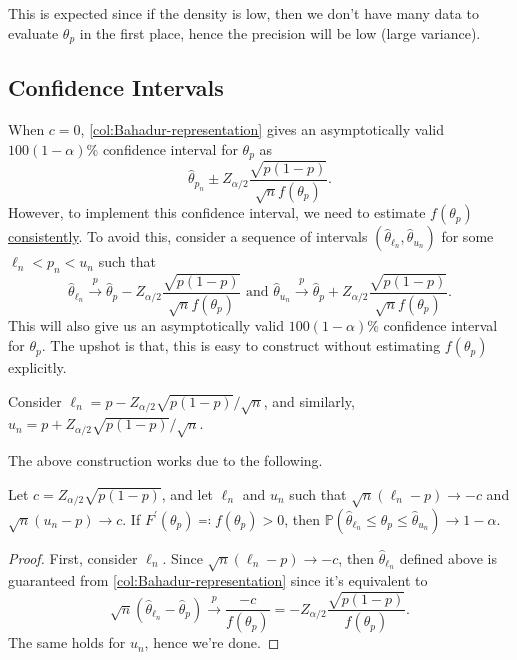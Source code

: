 \begin{intuition}
	This is expected since if the density is low, then we don't have many data to evaluate \(\theta _p\) in the first place, hence the precision will be low (large variance).
\end{intuition}

\subsection{Confidence Intervals}
When \(c = 0\), \autoref{col:Bahadur-representation} gives an asymptotically valid \(100(1 - \alpha )\%\) confidence interval for \(\theta _p\) as
\[
	\hat{\theta} _{p_n} \pm Z_{\alpha / 2} \frac{\sqrt{p(1 - p)} }{\sqrt{n} f(\theta _p)}.
\]
However, to implement this confidence interval, we need to estimate \(f(\theta _p)\) \hyperref[def:consistent]{consistently}. To avoid this, consider a sequence of intervals \((\hat{\theta} _{\ell _n}, \hat{\theta} _{u_n})\) for some \(\ell _n < p_n < u_n\) such that
\[
	\hat{\theta} _{\ell _n}
	\overset{p}{\to} \hat{\theta} _p - Z_{\alpha / 2} \frac{\sqrt{p (1 - p)} }{\sqrt{n} f(\theta _p)}
	\text{ and }
	\hat{\theta} _{u_n}
	\overset{p}{\to} \hat{\theta} _p + Z_{\alpha / 2} \frac{\sqrt{p (1 - p)} }{\sqrt{n} f(\theta _p)}.
\]
This will also give us an asymptotically valid \(100(1 - \alpha )\%\) confidence interval for \(\theta _p\). The upshot is that, this is easy to construct without estimating \(f(\theta _p)\) explicitly.

\begin{eg}
	Consider \(\ell _n = p - Z_{\alpha / 2} \sqrt{p (1 - p)} / \sqrt{n} \), and similarly, \(u_n = p + Z_{\alpha / 2} \sqrt{p (1 - p)} / \sqrt{n} \).
\end{eg}

The above construction works due to the following.

\begin{proposition}\label{prop:sample-quantile-confidence-interval}
	Let \(c = Z_{\alpha / 2} \sqrt{p(1 - p)} \), and let \(\ell _n\) and \(u_n\) such that \(\sqrt{n} (\ell _n - p) \to -c\) and \(\sqrt{n} (u_n - p) \to c\). If \(F^{\prime} (\theta _p) \eqqcolon f(\theta _p) > 0\), then \(\mathbb{P} (\hat{\theta} _{\ell _n} \leq \theta _p \leq \hat{\theta} _{u_n}) \to 1 - \alpha \).
\end{proposition}
\begin{proof}
	First, consider \(\ell _n\). Since \(\sqrt{n} (\ell _n - p) \to -c\), then \(\hat{\theta} _{\ell _n}\) defined above is guaranteed from \autoref{col:Bahadur-representation} since it's equivalent to
	\[
		\sqrt{n} (\hat{\theta} _{\ell _n} - \hat{\theta} _p)
		\overset{p}{\to} \frac{-c}{f(\theta _p)}
		= -Z_{\alpha / 2} \frac{\sqrt{p (1 - p)} }{f(\theta _p)}.
	\]
	The same holds for \(u_n\), hence we're done.
\end{proof}


